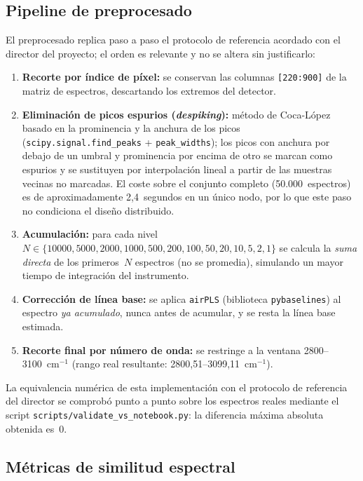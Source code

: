 \subsection{Pipeline de preprocesado}

El preprocesado replica paso a paso el protocolo de referencia acordado con el director del proyecto; el orden es relevante y no se altera sin justificarlo:

\begin{enumerate}
    \item \textbf{Recorte por índice de píxel:} se conservan las columnas \texttt{[220:900]} de la matriz de espectros, descartando los extremos del detector.
    \item \textbf{Eliminación de picos espurios (\textit{despiking}):} método de Coca-López \citep{cocalopez2024despiking} basado en la prominencia y la anchura de los picos (\texttt{scipy.signal.find\_peaks} + \texttt{peak\_widths}); los picos con anchura por debajo de un umbral y prominencia por encima de otro se marcan como espurios y se sustituyen por interpolación lineal a partir de las muestras vecinas no marcadas. El coste sobre el conjunto completo (50.000~espectros) es de aproximadamente 2,4~segundos en un único nodo, por lo que este paso no condiciona el diseño distribuido.
    \item \textbf{Acumulación:} para cada nivel~$N \in \{10000, 5000, 2000, 1000, 500, 200, 100, 50, 20, 10, 5, 2, 1\}$ se calcula la \textit{suma directa} de los primeros~$N$ espectros (no se promedia), simulando un mayor tiempo de integración del instrumento.
    \item \textbf{Corrección de línea base:} se aplica \texttt{airPLS} \citep{zhang2010airpls} (biblioteca \texttt{pybaselines}) al espectro \textit{ya acumulado}, nunca antes de acumular, y se resta la línea base estimada.
    \item \textbf{Recorte final por número de onda:} se restringe a la ventana 2800--3100~cm$^{-1}$ (rango real resultante: 2800{,}51--3099{,}11~cm$^{-1}$).
\end{enumerate}

La equivalencia numérica de esta implementación con el protocolo de referencia del director se comprobó punto a punto sobre los espectros reales mediante el script \texttt{scripts/validate\_vs\_notebook.py}: la diferencia máxima absoluta obtenida es~0.

\subsection{Métricas de similitud espectral}

